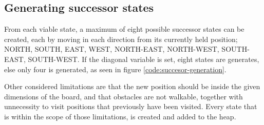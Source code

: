 \subsection{Generating successor states}
From each viable state, a maximum of eight possible successor states can be created, each by moving in each direction from its currently held position; NORTH, SOUTH, EAST, WEST, NORTH-EAST, NORTH-WEST, SOUTH-EAST, SOUTH-WEST. If the diagonal variable is set, eight states are generates, else only four is generated, as seen in figure \ref{code:succesor-generation}.

Other considered limitations are that the new position should be inside the given dimensions of the board, and that obstacles are not walkable, together with unnecessity to visit positions that previously have been visited. Every state that is within the scope of those limitations, is created and added to the heap. 



